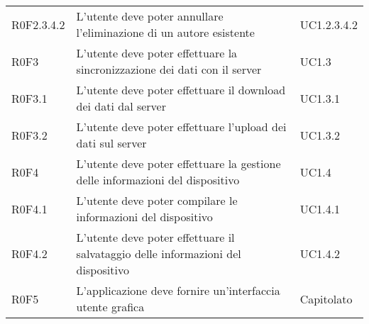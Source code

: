 \begin{longtable}{lp{}l}
R0F2.3.4.2
& L'utente deve poter annullare l'eliminazione di un autore esistente
& UC1.2.3.4.2 \\
R0F3
& L'utente deve poter effettuare la sincronizzazione dei dati con il server
& UC1.3 \\
R0F3.1
& L'utente deve poter effettuare il download dei dati dal server
& UC1.3.1 \\
R0F3.2
& L'utente deve poter effettuare l'upload dei dati sul server
& UC1.3.2 \\
R0F4
& L'utente deve poter effettuare la gestione delle informazioni del dispositivo
& UC1.4 \\
R0F4.1
& L'utente deve poter compilare le informazioni del dispositivo
& UC1.4.1 \\
R0F4.2
& L'utente deve poter effettuare il salvataggio delle informazioni del dispositivo
& UC1.4.2 \\
R0F5
& L'applicazione deve fornire un'interfaccia utente grafica
& Capitolato \\
\end{longtable}